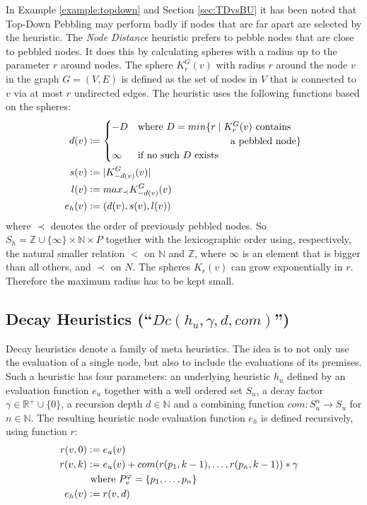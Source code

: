 In Example \ref{example:topdown} and Section \ref{sec:TDvsBU} it has been noted that Top-Down Pebbling may perform badly if nodes that are far apart are selected by the heuristic.
The \emph{Node Distance} heuristic prefers to pebble nodes that are close to pebbled nodes. It does this by calculating spheres with a radius up to the parameter $r$ around nodes.
The sphere $K_r^{G}(v)$ with radius $r$ around the node $v$ in the graph $G = (V,E)$ is defined as the set 
of nodes in $V$ that is connected to $v$ via at most $r$ undirected edges.
The heuristic uses the following functions based on the spheres:
\begin{align*}
	d(v) &\defeq 
	\begin{cases}
		-D &\text{where } D = min\{r \mid K_r^{G}(v)  \text{ contains}\\
			 & \hspace{3.3cm}  \text{a pebbled node}\}\\
		\infty & \text{if no such } D \text{ exists} 
	\end{cases}\\
	s(v) &\defeq |K_{-d(v)}^G(v)|\\
	l(v) &\defeq max_{\prec}K_{-d(v)}^G(v)\\
	e_h(v) &\defeq (d(v),s(v),l(v))
\end{align*}
where $\prec$ denotes the order of previously pebbled nodes.
So $S_h = \mathbb{Z} \cup \{\infty\} \times \mathbb{N} \times P$ together with the lexicographic order using, respectively, the natural smaller relation $<$ on $\mathbb{N}$ and $\mathbb{Z}$, where $\infty$ is an element that is bigger than all others, and $\prec$ on $N$. The spheres $K_r(v)$ can grow exponentially in $r$. Therefore the maximum radius has to be kept small.

\subsection{Decay Heuristics (``$Dc(h_u,\gamma,d,com)$'') }
\label{sec:decay}
Decay heuristics denote a family of meta heuristics. 
The idea is to not only use the evaluation of a single node, but also to include the evaluations of its premises.
Such a heuristic has four parameters: an underlying heuristic $h_u$ defined by an evaluation function $e_u$ together with a well ordered set $S_u$, a decay factor $\gamma \in \mathbb{R}^+ \cup \{0\}$, a recursion depth $d \in \mathbb{N}$ and a combining function $com: S_u^n \rightarrow S_u$ for $n \in \mathbb{N}$.
The resulting heuristic node evaluation function $e_h$ is defined recursively, using function $r$:
\begin{align*}
	r(v,0) &\mathrel{\mathop:}= e_u(v) \\
	r(v,k) &\mathrel{\mathop:}= e_u(v) + com(r(p_1,k-1), \ldots,r(p_n,k-1)) * \gamma\\
	& \text{ where } P_{v}^{\varphi} = \{p_1,\ldots,p_n\}\\
	e_h(v) &\mathrel{\mathop:}= r(v,d) &
\end{align*}

